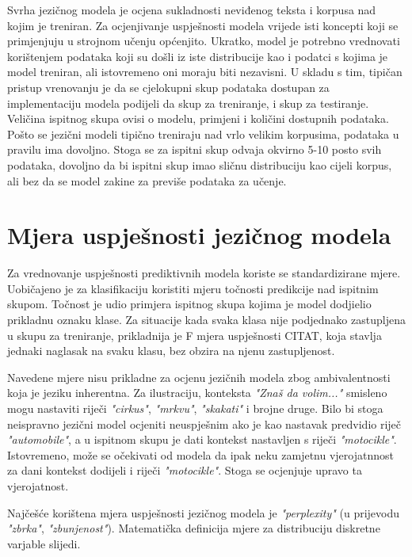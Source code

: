 \documentclass[times, utf8, diplomski, numeric]{fer}
\begin{document}
Svrha jezičnog modela je ocjena sukladnosti neviđenog teksta i korpusa nad kojim je treniran. Za ocjenjivanje uspješnosti modela vrijede isti koncepti koji se primjenjuju u strojnom učenju općenjito. Ukratko, model je potrebno vrednovati korištenjem podataka koji su došli iz iste distribucije kao i podatci s kojima je model treniran, ali istovremeno oni moraju biti nezavisni. U skladu s tim, tipičan pristup vrenovanju je da se cjelokupni skup podataka dostupan za implementaciju modela podijeli da skup za treniranje, i skup za testiranje. Veličina ispitnog skupa ovisi o modelu, primjeni i količini dostupnih podataka. Pošto se jezični modeli tipično treniraju nad vrlo velikim korpusima, podataka u pravilu ima dovoljno. Stoga se za ispitni skup odvaja okvirno 5-10 posto svih podataka, dovoljno da bi ispitni skup imao sličnu distribuciju kao cijeli korpus, ali bez da se model zakine za previše podataka za učenje.

\section{Mjera uspješnosti jezičnog modela}

Za vrednovanje uspješnosti prediktivnih modela koriste se standardizirane mjere. Uobičajeno je za klasifikaciju koristiti mjeru točnosti predikcije nad ispitnim skupom. Točnost je udio primjera ispitnog skupa kojima je model dodjielio prikladnu oznaku klase. Za situacije kada svaka klasa nije podjednako zastupljena u skupu za treniranje, prikladnija je F mjera uspješnosti CITAT, koja stavlja jednaki naglasak na svaku klasu, bez obzira na njenu zastupljenost.

Navedene mjere nisu prikladne za ocjenu jezičnih modela zbog ambivalentnosti koja je jeziku inherentna. Za ilustraciju, konteksta \textit{"Znaš da volim..."} smisleno mogu nastaviti riječi \textit{"cirkus"}, \textit{"mrkvu"}, \textit{"skakati"} i brojne druge. Bilo bi stoga neispravno jezični model ocjeniti neuspješnim ako je kao nastavak predvidio riječ \textit{"automobile"}, a u ispitnom skupu je dati kontekst nastavljen s riječi \textit{"motocikle"}. Istovremeno, može se očekivati od modela da ipak neku zamjetnu vjerojatnnost za dani kontekst dodijeli i riječi \textit{"motocikle"}. Stoga se ocjenjuje upravo ta vjerojatnost.

Najčešće korištena mjera uspješnosti jezičnog modela je \textit{"perplexity"} (u prijevodu \textit{"zbrka"}, \textit{"zbunjenost"}). Matematička definicija mjere za distribuciju diskretne varjable slijedi.
\end{document}
